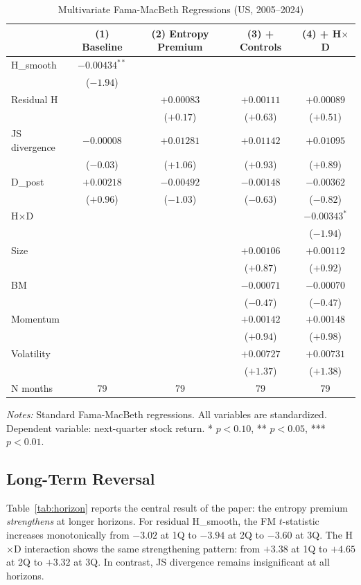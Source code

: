 \documentclass[12pt,a4paper]{article}
\begin{document}
\begin{table}[H]
\centering
\caption{Multivariate Fama-MacBeth Regressions (US, 2005--2024)}
\label{tab:fm_multi}
\small
\begin{tabular}{lcccc}
\toprule
 & (1) Baseline & (2) Entropy Premium & (3) + Controls & (4) + H$\times$D \\
\midrule
H\_smooth & $-0.00434^{**}$ & & & \\
 & ($-1.94$) & & & \\
Residual H & & $+0.00083$ & $+0.00111$ & $+0.00089$ \\
 & & ($+0.17$) & ($+0.63$) & ($+0.51$) \\
JS divergence & $-0.00008$ & $+0.01281$ & $+0.01142$ & $+0.01095$ \\
 & ($-0.03$) & ($+1.06$) & ($+0.93$) & ($+0.89$) \\
D\_post & $+0.00218$ & $-0.00492$ & $-0.00148$ & $-0.00362$ \\
 & ($+0.96$) & ($-1.03$) & ($-0.63$) & ($-0.82$) \\
H$\times$D & & & & $-0.00343^{*}$ \\
 & & & & ($-1.94$) \\
Size & & & $+0.00106$ & $+0.00112$ \\
 & & & ($+0.87$) & ($+0.92$) \\
BM & & & $-0.00071$ & $-0.00070$ \\
 & & & ($-0.47$) & ($-0.47$) \\
Momentum & & & $+0.00142$ & $+0.00148$ \\
 & & & ($+0.94$) & ($+0.98$) \\
Volatility & & & $+0.00727$ & $+0.00731$ \\
 & & & ($+1.37$) & ($+1.38$) \\
\midrule
N months & 79 & 79 & 79 & 79 \\
\bottomrule
\end{tabular}
\end{table}
\noindent\textit{Notes:} Standard Fama-MacBeth regressions. All variables are standardized. Dependent variable: next-quarter stock return. * $p<0.10$, ** $p<0.05$, *** $p<0.01$.

\subsection{Long-Term Reversal}\label{sec:results_horizon}

Table~\ref{tab:horizon} reports the central result of the paper: the entropy premium \textit{strengthens} at longer horizons. For residual H\_smooth, the FM $t$-statistic increases monotonically from $-3.02$ at 1Q to $-3.94$ at 2Q to $-3.60$ at 3Q. The H$\times$D interaction shows the same strengthening pattern: from $+3.38$ at 1Q to $+4.65$ at 2Q to $+3.32$ at 3Q. In contrast, JS divergence remains insignificant at all horizons.
\end{document}
